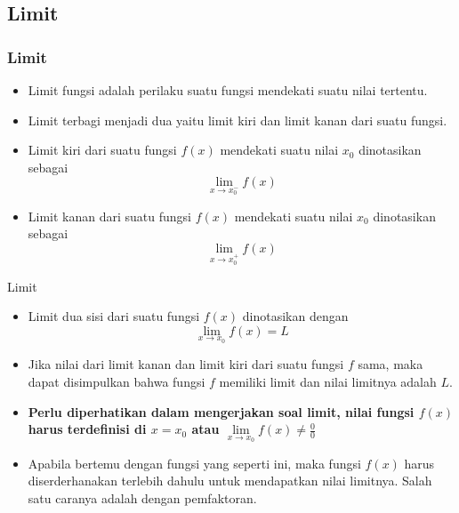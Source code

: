 \documentclass[pdflatex,compress,mathserif]{beamer}
\begin{document}
	\subsection{Limit}
	
		\begin{frame}
			\frametitle{Limit}
			\begin{itemize}
				\item Limit fungsi adalah perilaku suatu fungsi mendekati suatu nilai tertentu.
				\item Limit terbagi menjadi dua yaitu limit kiri dan limit kanan dari suatu fungsi.
				\item Limit kiri dari suatu fungsi $ f(x) $ mendekati suatu nilai $ x_0 $ dinotasikan sebagai
				\begin{equation*}
					\lim\limits_{x \rightarrow x_0^-}f(x)
				\end{equation*}
				\item Limit kanan dari suatu fungsi $ f(x) $ mendekati suatu nilai $ x_0 $ dinotasikan sebagai
				\begin{equation*}
					\lim\limits_{x \rightarrow x_0^+}f(x)
				\end{equation*}
			\end{itemize}
		\end{frame}
	
		\begin{frame}{Limit}
			\begin{itemize}
				\item Limit dua sisi dari suatu fungsi $ f(x) $ dinotasikan dengan
				\begin{equation*}
					\lim\limits_{x \rightarrow x_0}f(x) = L
				\end{equation*}
				\item Jika nilai dari limit kanan dan limit kiri dari suatu fungsi $ f $ sama, maka dapat disimpulkan bahwa fungsi $ f $ memiliki limit dan nilai limitnya adalah $ L $.
				\item \textbf{Perlu diperhatikan dalam mengerjakan soal limit, nilai fungsi $ f(x) $ harus terdefinisi di $ x = x_0 $ atau $ \lim\limits_{x \rightarrow x_0} f(x) \neq \frac{0}{0} $ }
				\item Apabila bertemu dengan fungsi yang seperti ini, maka fungsi $ f(x) $ harus diserderhanakan terlebih dahulu untuk mendapatkan nilai limitnya. Salah satu caranya adalah dengan
				pemfaktoran.
			\end{itemize}
		\end{frame}
	
\end{document}
